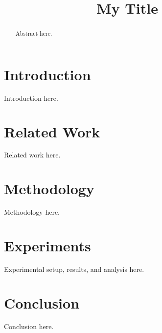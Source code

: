 \documentclass[sigconf, anonymous, review]{acmart}
\begin{document}
\title{My Title}

\begin{abstract}
Abstract here.
\end{abstract}


\maketitle

\section{Introduction}
\label{sec:intro}
Introduction here.

\section{Related Work}
\label{sec:related_work}
Related work here.

\section{Methodology}
\label{sec:method}
Methodology here.

\section{Experiments}
\label{sec:experiments}
Experimental setup, results, and analysis here.

\section{Conclusion}
\label{sec:conclusion}
Conclusion here.




\end{document}
